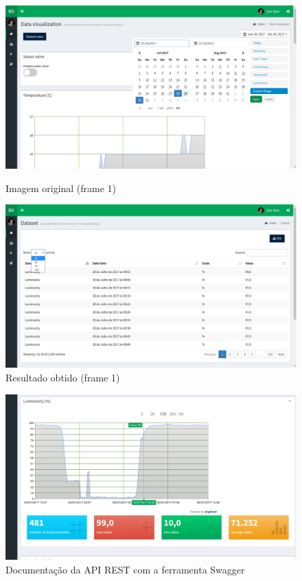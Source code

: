 \begin{figure}[h]
	\centering
	\begin{minipage}[b]{0.495\textwidth}
		\centering
		\includegraphics[width=\textwidth]{prints-web/dataview.png}
		\caption{Imagem original (frame 1)}
		\label{bluetth05-res}
	\end{minipage}
	\hfill
	\begin{minipage}[b]{0.495\textwidth}
		\centering
		\includegraphics[width=\textwidth]{prints-web/datatab.png}
		\caption{Resultado obtido (frame 1)}
		\label{comimageesquema}
	\end{minipage}
\end{figure}




\begin{figure}[h]
	\centering
	\includegraphics[width=0.7\linewidth]{prints-web/humidity.png}
	\caption{Documentação da API REST com a ferramenta Swagger}
	\label{testgrap}
\end{figure}



